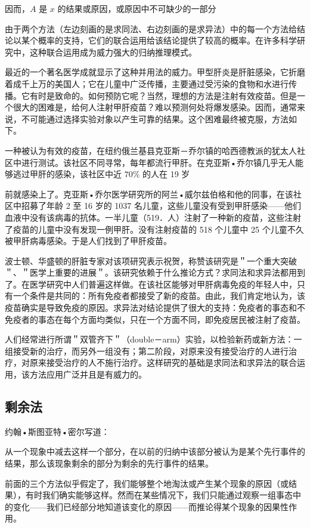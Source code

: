 因而，$A$ 是 $x$ 的结果或原因，或原因中不可缺少的一部分

由于两个方法（左边刻画的是求同法、右边刻画的是求异法）中的每一个方法给结论以某个概率的支持，它们的联合运用给该结论提供了较高的概率。在许多科学研究中，这种联合运用成为威力强大的归纳推理模式。

最近的一个著名医学成就显示了这种并用法的威力。甲型肝炎是肝脏感染，它折磨着成千上万的美国人；它在儿童中广泛传播，主要通过受污染的食物和水进行传播。它有时是致命的。如何预防它呢？当然，理想的方法是注射有效疫苗。但是一个很大的困难是，给何人注射甲肝疫苗？难以预测何处将爆发感染。因而，通常来说，不可能通过选择实验对象以产生可靠的结果。这个困难最终被克服，方法如下。

一种被认为有效的疫苗，在纽约俄兰基县克亚斯－乔尔镇的哈西德教派的犹太人社区中进行测试。该社区不同寻常，每年都流行甲肝。在克亚斯•乔尔镇几乎无人能够逃过甲肝的感染，该社区中近 $70 \%$ 的人在 19 岁

前就感染上了。克亚斯•乔尔医学研究所的阿兰•威尔兹伯格和他的同事，在该社区中招募了年龄 2 至 16 岁的 1037 名儿童，这些儿童没有受到甲肝感染——他们血液中没有该病毒的抗体。一半儿童（519．人）注射了一种新的疫苗，这些注射了疫苗的儿童中没有发现一例甲肝。没有注射疫苗的 518 个儿童中 25 个儿童不久被甲肝病毒感染。于是人们找到了甲肝疫苗。\cite{werzberger1992}

波士顿、华盛顿的肝脏专家对该项研究表示祝贺，称赞该研究是＂一个重大突破＂、＂医学上重要的进展＂。该研究依赖于什么推论方式？求同法和求异法都用到了。在医学研究中人们普遍这样做。在该社区能够对甲肝病毒免疫的年轻人中，只有一个条件是共同的：所有免疫者都接受了新的疫苗。由此，我们肯定地认为，该疫苗确实是导致免疫的原因。求异法对结论提供了很大的支持：免疫者的事态和不免疫者的事态在每个方面均类似，只在一个方面不同，即免疫居民被注射了疫苗。

人们经常进行所谓＂双管齐下＂（double－arm）实验，以检验新药或新方法：一组接受新的治疗，而另外一组没有；第二阶段，对原来没有接受治疗的人进行治疗，对原来接受治疗的人不施行治疗。这样研究的基础是求同法和求异法的联合运用，该方法应用广泛并且是有威力的。

\subsection{剩余法}
约翰•斯图亚特•密尔写道：

从一个现象中减去这样一个部分，在以前的归纳中该部分被认为是某个先行事件的结果，那么该现象剩余的部分为剩余的先行事件的结果。

前面的三个方法似乎假定了，我们能够整个地淘汰或产生某个现象的原因（或结果），有时我们确实能够这样。然而在某些情况下，我们只能通过观察一组事态中的变化——我们已经部分地知道该变化的原因——而推论得某个现象的因果性作用。


